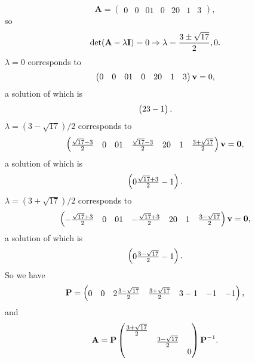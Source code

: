 \documentclass[hyperref, a4paper]{article}
\def\\{}%
\newcommand*{\mat}[1]{\vb{#1}}
\begin{document}
\begin{equation}
    \mathbf{A}=\left(\begin{array}{lll}
        0 & 0 & 0 \\
        1 & 0 & 2 \\
        0 & 1 & 3
        \end{array}\right),
\end{equation}
so 
\begin{equation}
    \det (\mat{A} - \lambda \mat{I}) = 0 \Rightarrow
    \lambda = \frac{3 \pm \sqrt{17}}{2}, 0.
\end{equation}
$\lambda = 0$ corresponds to 
\[
    \pmqty{
        0 & 0 & 0 \\
        1 & 0 & 2 \\
        0 & 1 & 3
    } \vb{v} = 0, 
\]
a solution of which is 
\[
    \pmqty{2 \\ 3 \\ -1}.
\]
$\lambda = (3 - \sqrt{17}) / 2$ corresponds to 
\[
    \pmqty{
        \frac{\sqrt{17} - 3}{2} & 0 & 0 \\
        1 & \frac{\sqrt{17} - 3}{2} & 2 \\
        0 & 1 & \frac{3 + \sqrt{17}}{2}
    } \vb{v} = \vb{0},
\]
a solution of which is 
\[
    \pmqty{
        0 \\ \frac{\sqrt{17} + 3}{2} \\ -1
    }.
\]
$\lambda = (3 + \sqrt{17}) / 2$ corresponds to 
\[
    \pmqty{
        -\frac{\sqrt{17} + 3}{2} & 0 & 0 \\
        1 & -\frac{\sqrt{17} + 3}{2} & 2 \\
        0 & 1 & \frac{3 - \sqrt{17}}{2}
    } \vb{v} = \vb{0},
\]
a solution of which is 
\[
    \pmqty{
        0 \\ \frac{3 - \sqrt{17}}{2} \\ -1
    }.
\]
So we have 
\begin{equation}
    \mat{P} = \pmqty{
         0 & 0  & 2\\
        \frac{3 - \sqrt{17}}{2} & \frac{3 + \sqrt{17}}{2} & 3 \\
        -1 & -1 & -1
    },
\end{equation}
and 
\begin{equation}
    \mat{A} = \mat{P} \pmqty{\dmat{\frac{3 + \sqrt{17}}{2}, \frac{3 - \sqrt{17}}{2}, 0}} \mat{P}^{-1}.
\end{equation}

\section{}
\end{document}
